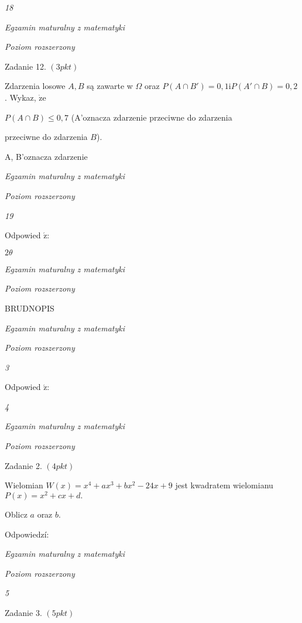 \documentclass[a4paper,12pt]{article}
\begin{document}
{\it 18}

{\it Egzamin maturalny z matematyki}

{\it Poziom rozszerzony}

Zadanie 12. $(3pkt)$

Zdarzenia losowe $A, B$ są zawarte w $\Omega$ oraz $P(A\cap B')=0,1 \mathrm{i}P(A'\cap B)=0,2$. Wykaz, $\dot{\mathrm{z}}\mathrm{e}$

$P(A\cap B)\leq 0,7$ (A'oznacza zdarzenie przeciwne do zdarzenia

przeciwne do zdarzenia $B$).

A, B'oznacza zdarzenie





{\it Egzamin maturalny z matematyki}

{\it Poziom rozszerzony}

{\it 19}

Odpowied $\acute{\mathrm{z}}$:





$ 2\theta$

{\it Egzamin maturalny z matematyki}

{\it Poziom rozszerzony}

BRUDNOPIS





{\it Egzamin maturalny z matematyki}

{\it Poziom rozszerzony}

{\it 3}

Odpowied $\acute{\mathrm{z}}$:





{\it 4}

{\it Egzamin maturalny z matematyki}

{\it Poziom rozszerzony}

Zadanie 2. $(4pkt)$

Wielomian $W(x)=x^{4}+ax^{3}+bx^{2}-24x+9$ jest kwadratem wielomianu $P(x)=x^{2}+cx+d.$

Oblicz $a$ oraz $b.$

Odpowiedzí:





{\it Egzamin maturalny z matematyki}

{\it Poziom rozszerzony}

{\it 5}

Zadanie 3. $(5pkt)$
\end{document}
